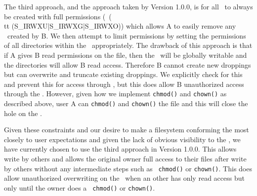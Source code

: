 \documentclass[10pt]{article}
\begin{document}
The third approach, and the approach taken by Version 1.0.0, is for all
\droppings\ to always be created with full permissions (\ie\ ({\\tt
 (S\_IRWXU|S\_IRWXG|S\_IRWXO)}) which allows A to easily remove any 
\droppings\ created by B.  We then attempt to limit permissions by
setting the permissions of all directories within the \container\ 
appropriately.  The drawback of this approach is that if A gives B read
permissions on the file, then the \droppings\ will be globally writable
and the directories will allow B read access.  Therefore B cannot 
create new droppings but can overwrite and truncate existing droppings.
We explicitly check for this and prevent this for access through \fuse,
but this does allow B unauthorized access through the \store.  However,
given how we implement {\tt chmod()} and {\tt chown()} as described
above, user A can {\tt chmod()} and {\tt chown()} the file and this
will close the hole on the \store.

Given these constraints and our desire to make a filesystem conforming the most
closely to user expectations and given the lack of obvious visibility to the
\store, we have currently chosen to use the third approach in Version 1.0.0.
This allows write by others and allows the original owner full access to their
files after write by others without any intermediate steps such as {\tt
chmod()} or {\tt chown()}.  This does allow unauthorized overwriting on the
\store\ when an other has only read access but only until the owner does a {\tt
chmod()} or {\tt chown()}.
\end{document}
